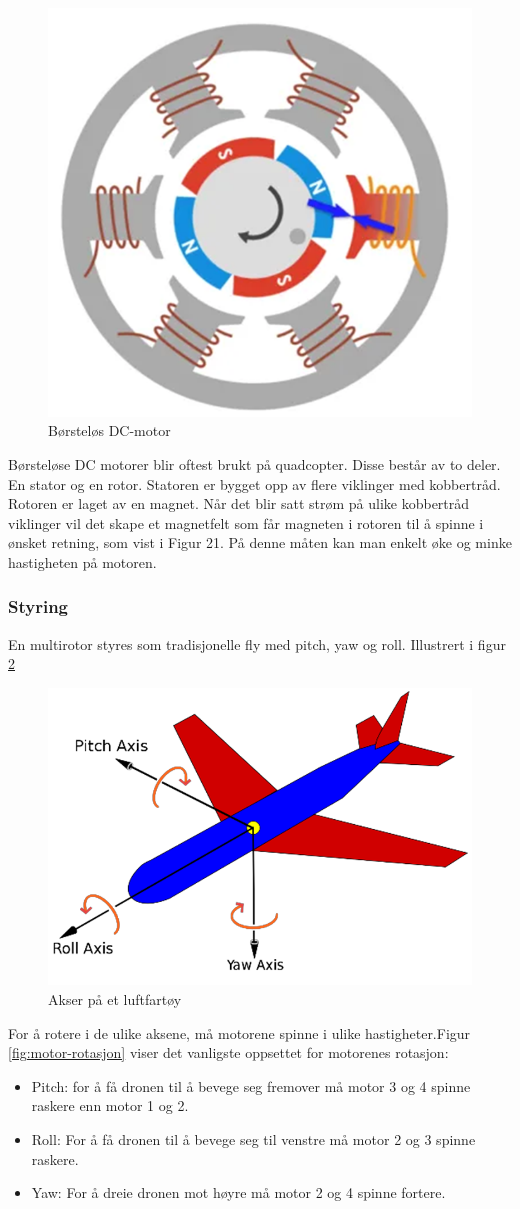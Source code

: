 \begin{figure}[htp]
    \centering
    \includegraphics[width=0.4\columnwidth]{figures/dc-motor}
    \caption{Børsteløs DC-motor}
    \label{fig:dc-motor}
\end{figure}

Børsteløse DC motorer blir oftest brukt på quadcopter. Disse består av to deler. En stator og en rotor. Statoren er bygget opp av flere viklinger med kobbertråd. Rotoren er laget av en magnet. Når det blir satt strøm på ulike kobbertråd viklinger vil det skape et magnetfelt som får magneten i rotoren til å spinne i ønsket retning, som vist i Figur 21. På denne måten kan man enkelt øke og minke hastigheten på motoren.

\subsubsection{Styring}
En multirotor styres som tradisjonelle fly med pitch, yaw og roll. Illustrert i figur \ref{fig:akser}

\begin{figure}[htp]
    \centering
    \includegraphics[width=0.4\columnwidth]{figures/akser}
    \caption{Akser på et luftfartøy}
    \label{fig:akser}
\end{figure}

For å rotere i de ulike aksene, må motorene spinne i ulike hastigheter.Figur \ref{fig:motor-rotasjon} viser det vanligste oppsettet for motorenes rotasjon:

\begin{itemize}
\item Pitch: for å få dronen til å bevege seg fremover må motor 3 og 4 spinne raskere enn motor 1 og 2.
\item Roll: For å få dronen til å bevege seg til venstre må motor 2 og 3 spinne raskere.
\item Yaw: For å dreie dronen mot høyre må motor 2 og 4 spinne fortere.
\end{itemize}

